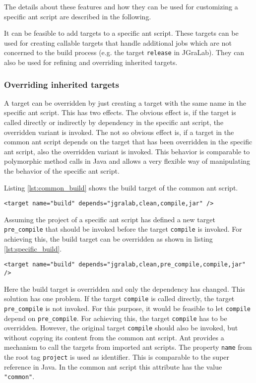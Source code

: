\documentclass[a4paper,twoside,11pt,bibtotoc]{article}
\begin{document}
The details about these features and how they can be used for customizing a specific ant script are described in the following.

It can be feasible to add targets to a specific ant script.
These targets can be used for creating callable targets that handle additional jobs which are not concerned to the build process (e.g. the target \texttt{release} in JGraLab).
They can also be used for refining and overriding inherited targets.

\subsubsection{Overriding inherited targets}
\label{sec:override}
A target can be overridden by just creating a target with the same name in the specific ant script.
This has two effects.
The obvious effect is, if the target is called directly or indirectly by dependency in the specific ant script, the overridden variant is invoked.
The not so obvious effect is, if a target in the common ant script depends on the target that has been overridden in the specific ant script, also the overridden variant is invoked.
This behavior is comparable to polymorphic method calls in Java and allows a very flexible way of manipulating the behavior of the specific ant script.

Listing \ref{lst:common_build} shows the build target of the common ant script.
\begin{lstlisting}[caption=Target built in the common ant script,label=lst:common_build,float=!ht,language=ant]
	<target name="build" depends="jgralab,clean,compile,jar" />
\end{lstlisting}

Assuming the project of a specific ant script has defined a new target \texttt{pre\_compile} that should be invoked before the target \texttt{compile} is invoked.
For achieving this, the build target can be overridden as shown in listing \ref{lst:specific_build}.

\begin{lstlisting}[caption=Target built in a specific ant script,label=lst:specific_build,float=!ht,language=ant]
	<target name="build" depends="jgralab,clean,pre_compile,compile,jar" />
\end{lstlisting}

Here the build target is overridden and only the dependency has changed.
This solution has one problem.
If the target \texttt{compile} is called directly, the target \texttt{pre\_compile} is not invoked.
For this purpose, it would be feasible to let \texttt{compile} depend on \texttt{pre\_compile}.
For achieving this, the target \texttt{compile} has to be overridden.
However, the original target \texttt{compile} should also be invoked, but without copying its content from the common ant script.
Ant provides a mechanism to call the targets from imported ant scripts.
The property \texttt{name} from the root tag \texttt{project} is used as identifier.
This is comparable to the super reference in Java.
In the common ant script this attribute has the value \texttt{"common"}.
\end{document}

